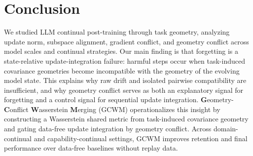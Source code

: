 \documentclass{article}
\begin{document}
\section{Conclusion}
\vspace{-0.4em}

We studied LLM continual post-training through task geometry, analyzing update norm, subspace alignment, gradient conflict, and geometry conflict across model scales and continual strategies. 
Our main finding is that forgetting is a state-relative update-integration failure: harmful steps occur when task-induced covariance geometries become incompatible with the geometry of the evolving model state. This explains why raw drift and isolated pairwise compatibility are insufficient, and why geometry conflict serves as both an explanatory signal for forgetting and a control signal for sequential update integration. 
\textbf{G}eometry-\textbf{C}onflict \textbf{W}asserstein \textbf{M}erging (GCWM) operationalizes this insight by constructing a Wasserstein shared metric from task-induced covariance geometry and gating data-free update integration by geometry conflict. Across domain-continual and capability-continual settings, GCWM improves retention and final performance over data-free baselines without replay data.







\newpage





\newpage
\appendix
\end{document}

